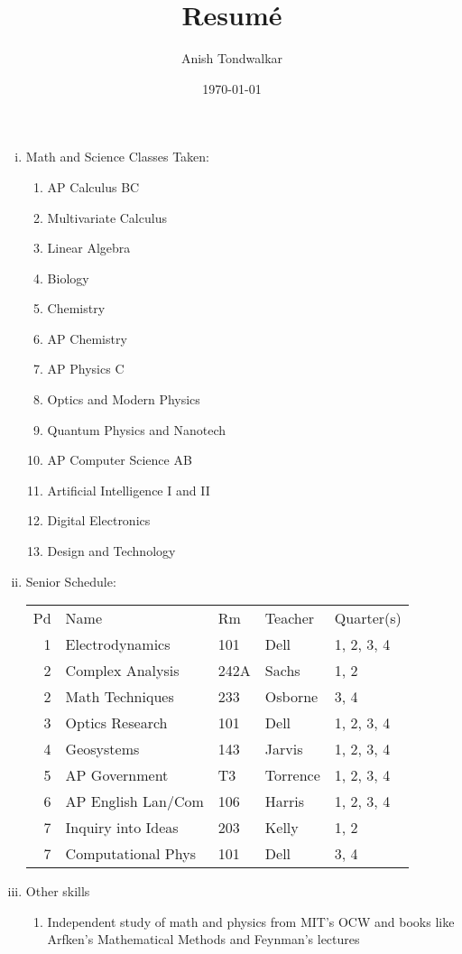 \documentclass[11pt,notitlepage]{article}
\title{Resum\'e}
\author{Anish Tondwalkar}
\date{\today}
\begin{document}
\maketitle
\begin{enumerate}[i)]
  \item Math and Science Classes Taken: 
    \begin{enumerate}
    \item AP Calculus BC
    \item Multivariate Calculus
    \item Linear Algebra
    \item Biology
    \item Chemistry
    \item AP Chemistry
    \item AP Physics C
    \item Optics and Modern Physics
    \item Quantum Physics and Nanotech
    \item AP Computer Science AB
    \item Artificial Intelligence I and II
    \item Digital Electronics
    \item Design and Technology  
  \end{enumerate}
  \item Senior Schedule: \\
    \begin{tabular}{r|llll}
      Pd&Name&Rm&Teacher&Quarter(s)\\
      1&Electrodynamics&101&Dell&1, 2, 3, 4\\
      2&Complex Analysis&242A&Sachs&1, 2\\
      2&Math Techniques&233&Osborne&3, 4\\
      3&Optics Research&101&Dell&1, 2, 3, 4\\
      4&Geosystems&143&Jarvis&1, 2, 3, 4\\
      5&AP Government&T3&Torrence&1, 2, 3, 4\\
      6&AP English Lan/Com&106&Harris&1, 2, 3, 4\\
      7&Inquiry into Ideas&203&Kelly&1, 2\\
      7&Computational Phys&101&Dell&3, 4\\
    \end{tabular} 
  \item Other skills
    \begin{enumerate}
      \item Independent study of math and physics from MIT's OCW and books like Arfken's Mathematical Methods and Feynman's lectures

\end{enumerate}
\end{enumerate}
\end{document}
